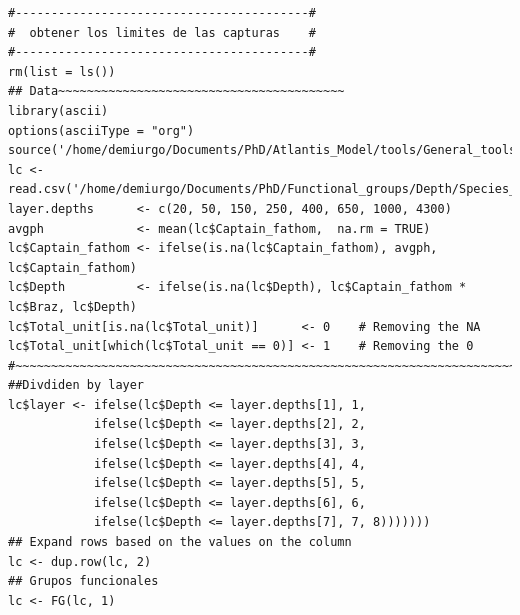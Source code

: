 \documentclass[11pt]{article}
\begin{document}
\begin{itemize}
\begin{itemize}
\begin{itemize}
\begin{verbatim}
#-----------------------------------------#
#  obtener los limites de las capturas    #
#-----------------------------------------#
rm(list = ls())
## Data~~~~~~~~~~~~~~~~~~~~~~~~~~~~~~~~~~~~~~~~
library(ascii)
options(asciiType = "org")
source('/home/demiurgo/Documents/PhD/Atlantis_Model/tools/General_tools/Atlantis_tools.R')
lc <- read.csv('/home/demiurgo/Documents/PhD/Functional_groups/Depth/Species_depth.csv')
layer.depths      <- c(20, 50, 150, 250, 400, 650, 1000, 4300)
avgph             <- mean(lc$Captain_fathom,  na.rm = TRUE)
lc$Captain_fathom <- ifelse(is.na(lc$Captain_fathom), avgph, lc$Captain_fathom)
lc$Depth          <- ifelse(is.na(lc$Depth), lc$Captain_fathom * lc$Braz, lc$Depth)
lc$Total_unit[is.na(lc$Total_unit)]      <- 0    # Removing the NA
lc$Total_unit[which(lc$Total_unit == 0)] <- 1    # Removing the 0
#~~~~~~~~~~~~~~~~~~~~~~~~~~~~~~~~~~~~~~~~~~~~~~~~~~~~~~~~~~~~~~~~~~~~~~~~~~~~~~~~
##Divdiden by layer
lc$layer <- ifelse(lc$Depth <= layer.depths[1], 1,
            ifelse(lc$Depth <= layer.depths[2], 2,
            ifelse(lc$Depth <= layer.depths[3], 3,
            ifelse(lc$Depth <= layer.depths[4], 4,
            ifelse(lc$Depth <= layer.depths[5], 5,
            ifelse(lc$Depth <= layer.depths[6], 6,
            ifelse(lc$Depth <= layer.depths[7], 7, 8)))))))
## Expand rows based on the values on the column
lc <- dup.row(lc, 2)
## Grupos funcionales
lc <- FG(lc, 1)


\end{verbatim}
\end{itemize}
\end{itemize}
\end{itemize}
\end{document}
